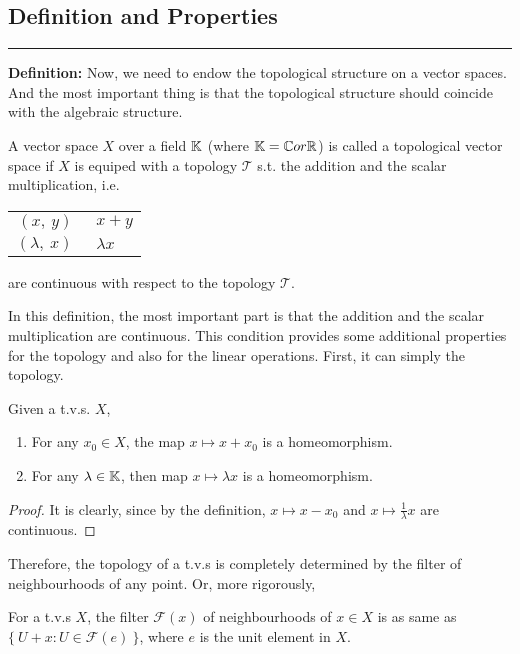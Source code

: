 \documentclass[a4paper,11pt]{report}
\begin{document}
\subsection{Definition and Properties}

\rule{1mm}{1mm} \textbf{Definition:} Now, we need to endow the topological structure on a vector spaces. And the most important thing is that the topological structure should coincide with the algebraic structure.
\begin{defn}
	A vector space $X$ over a field $\mathbb{K}$ (where $\mathbb{K} = \mathbb{C} or \mathbb{R}$) is called a topological vector space if $X$ is equiped with a topology $\mathscr{T}$ s.t. the addition and the scalar multiplication, i.e. 
	\begin{center}
		\begin{tabular}{r @{$\mapsto$} l}
			$(x,~y)~$ & $~x+y$ \\
			$(\lambda,~ x)~$ & $~ \lambda x$
		\end{tabular}
	\end{center}
	are continuous with respect to the topology $\mathscr{T}$.
\end{defn}

In this definition, the most important part is that the addition and the scalar multiplication are continuous. This condition provides some additional properties for the topology and also for the linear operations. First, it can simply the topology.

\begin{prop}
	Given a t.v.s. $X$, 
	\begin{enumerate}[label=\arabic*)]
		\item For any $x_0 \in X$, the map $x \mapsto x+x_0$ is a homeomorphism.
		\item For any $\lambda \in \mathbb{K}$, then map $x \mapsto \lambda x$ is a homeomorphism.
	\end{enumerate}
\end{prop}
\begin{proof}
	It is clearly, since by the definition, $x \mapsto x-x_0$ and $x \mapsto \frac{1}{\lambda}x$ are continuous.
\end{proof}

Therefore, the topology of a t.v.s is completely determined by the filter of neighbourhoods of any point. Or, more rigorously,
\begin{cor}
	For a t.v.s $X$, the filter $\mathscr{F}(x)$ of neighbourhoods of $x \in X$ is as same as $\{~ U+x \colon U \in \mathscr{F}(e) ~\}$, where $e$ is the unit element in $X$.
\end{cor}
\end{document}
